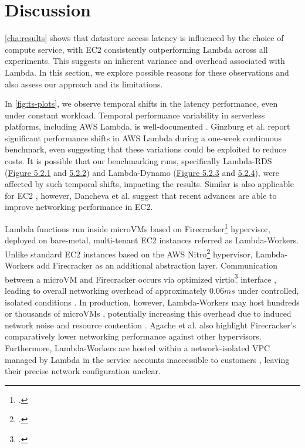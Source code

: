 \section{Discussion}
\label{cha:discuss}

\cref{cha:results} shows that datastore access latency is influenced by the choice of compute service, with EC2 consistently outperforming Lambda across all experiments. This suggests an inherent variance and overhead associated with Lambda. In this section, we explore possible reasons for these observations and also assess our approach and its limitations.

In \cref{fig:ts-plots}, we observe temporal shifts in the latency performance, even under constant workload. Temporal performance variability in serverless platforms, including AWS Lambda, is well-documented \cite{paper_ginzburg_lambda_var,article_eismann_lambda_var,paper_schirmer_night_shift}. Ginzburg et al. \cite{paper_ginzburg_lambda_var} report significant performance shifts in AWS Lambda during a one-week continuous benchmark, even suggesting that these variations could be exploited to reduce costs. It is possible that our benchmarking runs, specifically Lambda-RDS (\hyperref[fig:bar_rds_const]{Figure 5.2.1} and \hyperref[fig:bar_rds_bursty]{5.2.2}) and Lambda-Dynamo (\hyperref[fig:bar_ddb_const]{Figure 5.2.3} and \hyperref[fig:bar_ddb_bursty]{ 5.2.4}), were affected by such temporal shifts, impacting the results. Similar is also applicable for EC2 \cite{paper_iosup_performance,article_schad_cloud_var}, however, Dancheva et al. \cite{article_dancheva_ec2_var} suggest that recent advances are able to improve networking performance in EC2.

Lambda functions run inside microVMs based on Firecracker\footcite{https://firecracker-microvm.github.io/} hypervisor, deployed on bare-metal, multi-tenant EC2 instances referred as Lambda-Workers. Unlike standard EC2 instances based on the AWS Nitro\footcite{https://aws.amazon.com/ec2/nitro/} hypervisor, Lambda-Workers add Firecracker as an additional abstraction layer. Communication between a microVM and Firecracker occurs via optimized virtio\footcite{https://libvirt.org/} interface \cite{paper_brooker_lambda}, leading to overall networking overhead of approximately $0.06ms$ under controlled, isolated conditions \cite{repo_firecracker}. In production, however, Lambda-Workers may host hundreds or thousands of microVMs \cite{paper_agache_firecracker}, potentially increasing this overhead due to induced network noise and resource contention \cite{article_desensi_noise,paper_wang_faas_bts}. Agache et al. \cite{paper_agache_firecracker} also highlight Firecracker's comparatively lower networking performance against other hypervisors. Furthermore, Lambda-Workers are hosted within a network-isolated VPC managed by Lambda in the service accounts inaccessible to customers \cite{web_aws_lambda_security}, leaving their precise network configuration unclear.

